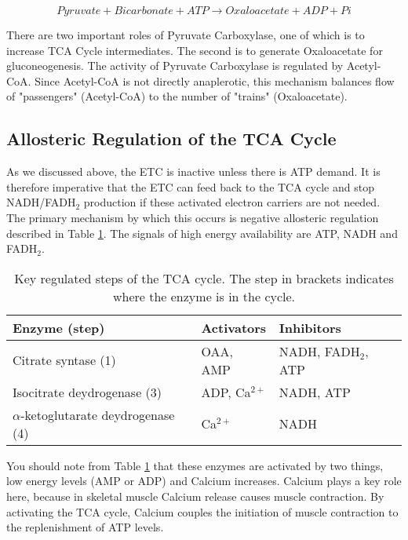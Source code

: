 \documentclass{tufte-handout}
\begin{document}
\begin{equation}\label{eq:pcx}
Pyruvate + Bicarbonate + ATP \rightarrow Oxaloacetate + ADP + Pi
\end{equation}

There are two important roles of Pyruvate Carboxylase, one of which is to increase TCA Cycle intermediates.  The second is to generate Oxaloacetate for gluconeogenesis.  The activity of Pyruvate Carboxylase is regulated by Acetyl-CoA.  Since Acetyl-CoA is not directly anaplerotic, this mechanism balances flow of "passengers" (Acetyl-CoA) to the number of "trains" (Oxaloacetate).  

\subsection{Allosteric Regulation of the TCA Cycle}

As we discussed above, the ETC is inactive unless there is ATP demand.  It is therefore imperative that the ETC can feed back to the TCA cycle and stop NADH/FADH$_2$ production if these activated electron carriers are not needed.  The primary mechanism by which this occurs is negative allosteric regulation described in Table \ref{tab:tca-allosteric}.  The signals of high energy availability are ATP, NADH and FADH$_2$.

\begin{table}
\centering
\caption{Key regulated steps of the TCA cycle.  The step in brackets indicates where the enzyme is in the cycle.}
\label{tab:tca-allosteric}
\begin{tabular}{lll}
\hline
\textbf {Enzyme (step)} & \textbf{Activators} & \textbf{Inhibitors}\\
\hline
Citrate syntase (1) & OAA, AMP & NADH, FADH$_2$, ATP\\
Isocitrate deydrogenase (3) & ADP, Ca$^{2+}$ &  NADH, ATP\\
$\alpha$-ketoglutarate deydrogenase (4) & Ca$^{2+}$ &  NADH\\
\hline
\end{tabular}
\end{table}

You should note from Table \ref{tab:tca-allosteric} that these enzymes are activated by two things, low energy levels (AMP or ADP) and Calcium increases.  Calcium plays a key role here, because in skeletal muscle Calcium release causes muscle contraction.  By activating the TCA cycle, Calcium couples the initiation of muscle contraction to the replenishment of ATP levels.
\end{document}
